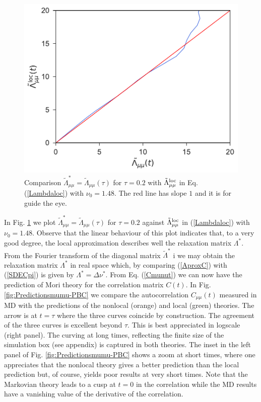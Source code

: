 \documentclass[b5paper,openright,11pt]{book}
\newcommand{\Pendiente}[1]{{\color{green}#1}} %
\begin{document}
\begin{figure}[h!]
  \centering
\includegraphics[scale=0.41]{CompareLambdas-PBC}
\caption[Comparison $\tilde{\Lambda}^*_{\mu\mu}$ and $\tilde{\Lambda}_{\mu\mu}(\tau)$]{Comparison $\tilde{\Lambda}^*_{\mu\mu}=\tilde{\Lambda}_{\mu\mu}(\tau)$ for $\tau=0.2$ with $\tilde{\Lambda}^{\rm loc}_{\mu\mu}$ in Eq. (\ref{Lambdaloc}) with $\nu_0=1.48$. The red line has slope $1$ and it is for guide the eye.}
\label{fig:CompareLambdas-PBC}
\end{figure}
In         Fig.           \ref{fig:CompareLambdas-PBC}         we         plot
$\tilde{\Lambda}^*_{\mu\mu}=\tilde{\Lambda}_{\mu\mu}(\tau)$        for
$\tau=0.2$    against    $\tilde{\Lambda}_{\mu\mu}^{\rm    loc}$    in
(\ref{Lambdaloc})   with  $\nu_0=1.48$. Observe that the linear behaviour of this plot
indicates  that,  to  a  very good  degree,  the  local  approximation
describes well the relaxation matrix $\Lambda^*$.
From the Fourier transform  of the diagonal matrix $\tilde{\Lambda}^*$ i
we may  obtain the relaxation  matrix $\Lambda^*$ in real space which,  by comparing
(\ref{AproxC})      with     (\ref{SDECpi})      is     given      by
$\Lambda^*=\Delta\nu^*$. From Eq.  (\ref{Cmunut}) we can
now  have the  prediction of  Mori theory  for the  correlation matrix
$C(t)$.  In Fig.  \ref{fig:Predictionsmumu-PBC} we compare the autocorrelation
$C_{\mu\mu}(t)$ measured in  MD with the predictions  of the nonlocal
(orange) and local  (green) theories.  The arrow is at  $t=\tau$ where the
three curves  coincide by  construction.  The  agreement of  the three
curves  is  excellent beyond  $\tau$.   This  is best  appreciated  in
logscale (right panel). The curving at long times,
reflecting the  finite size  of the simulation  box \Pendiente{(see  appendix)} is
captured in  both theories.  The inset  in the left panel of Fig.  \ref{fig:Predictionsmumu-PBC}
shows a zoom at short times,  where one appreciates that the nonlocal
theory gives  a better  prediction than the  local prediction  but, of
course,  yields  poor results  at  very  short  times. Note  that  the
Markovian theory leads to a cusp at $t=0$ in the correlation while the
MD  results  have   a  vanishing  value  of  the   derivative  of  the
correlation.
\end{document}
